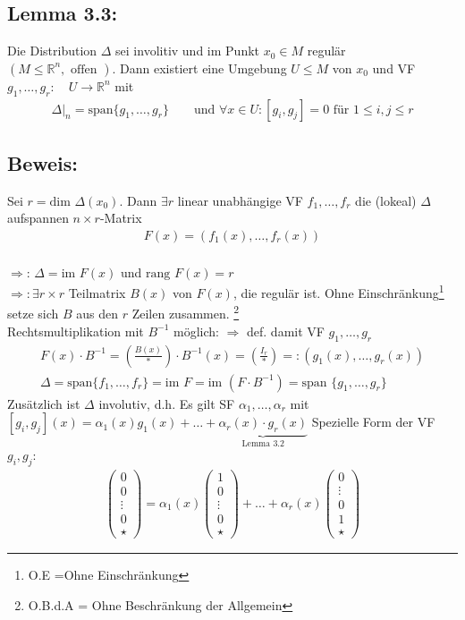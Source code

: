 \documentclass[ngerman]{tudscrreprt}
\begin{document}
\subsection*{Lemma 3.3:}
Die Distribution $\Delta$ sei involitiv und im Punkt $x_0 \in M$ regulär $(M \le \mathbb{R}^n, \text{ offen }).$ Dann existiert eine Umgebung $U \le M$ von $x_0$ und VF $g_1, \dots, g_r: \quad U\to \mathbb{R}^n$ mit \begin{align*} \Delta|_{n} = \text{span}\{ g_1,\dots, g_r\} \qquad \text{und } \forall x\in U: [g_i, g_j] = 0 \text{ für } 1\le i, j\le r \end{align*} 
\subsection*{Beweis:} Sei $r = \text{dim } \Delta(x_0).$ Dann $\exists r$ linear unabhängige VF $f_1,\dots, f_r$ die (lokeal) $\Delta$ aufspannen $n\times r$-Matrix \begin{align*} F(x) = (f_1(x), \dots, f_r(x)) \end{align*} 
\\$\Rightarrow$: $\Delta = \text{im }F(x)$ und $\text{rang }F(x) = r$ \\ 
$\Rightarrow: \exists r\times r $ Teilmatrix $B(x)$ von $F(x)$, die regulär ist. Ohne Einschränkung\footnote{O.E =Ohne Einschränkung} setze sich $B$ aus den $r$ Zeilen zusammen. \footnote{O.B.d.A = Ohne Beschränkung der Allgemein}\\ 
Rechtsmultiplikation mit $B^{-1}$ möglich: $\Rightarrow$ def. damit VF $g_1,\dots, g_r$ \begin{align*} F(x)\cdot B^{-1} = \left(\frac{B(x)}{*}\right)\cdot B^{-1}(x) = \left(\frac{I_r}{*}\right) =:(g_1(x),\dots,g_r(x))\\ 
\Delta = \text{span}\{ f_1,\dots,f_r \} = \text{im }F = \text{im }(F\cdot B^{-1}) = \text{span }\{g_1,\dots, g_r \}\end{align*}
Zusätzlich ist $\Delta$ involutiv, d.h. Es gilt SF $\alpha_1,\dots,\alpha_r$ mit $[g_i,g_j](x) = \alpha_1(x) g_1(x) + \dots + \underbrace{\alpha_r(x)\cdot g_r(x)}_{\text{Lemma 3.2}}$
Spezielle Form der VF $g_i, g_j:$
\begin{align*}
\begin{pmatrix} 0\\0\\ \vdots \\ 0\\ \star \end{pmatrix} = \alpha_1(x)\begin{pmatrix} 1\\ 0\\ \vdots\\ 0\\\star\end{pmatrix} + \dots + \alpha_r(x)\begin{pmatrix}0\\ \vdots\\ 0\\1\\\star\end{pmatrix}
\end{align*}
\end{document}
